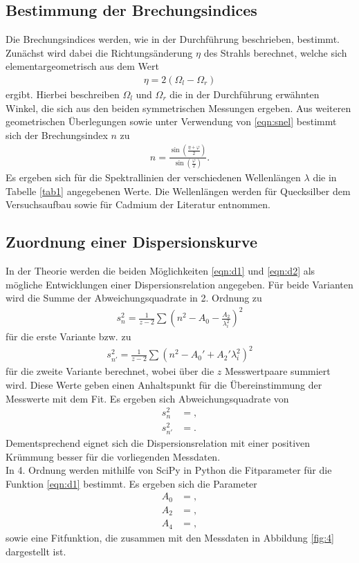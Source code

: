 \subsection{Bestimmung der Brechungsindices}
Die Brechungsindices werden, wie in der Durchführung beschrieben, bestimmt.
Zunächst wird dabei die Richtungsänderung $\eta$ des Strahls berechnet, welche sich elementargeometrisch aus dem Wert
\begin{align}
  \eta = 2 (\Omega_l - \Omega_r)
\end{align}
ergibt.
Hierbei beschreiben $\Omega_l$ und $\Omega_r$ die in der Durchführung erwähnten Winkel, die sich aus den beiden symmetrischen Messungen ergeben.
Aus weiteren geometrischen Überlegungen sowie unter Verwendung von \eqref{eqn:snel} bestimmt sich der Brechungsindex $n$ zu
\begin{align}
  n = \frac{\sin{(\frac{\eta + \varphi}{2})}}{\sin{(\frac{\varphi}{2})}}.
\end{align}
Es ergeben sich für die Spektrallinien der verschiedenen Wellenlängen $\lambda$ die in Tabelle \ref{tab1} angegebenen Werte.
Die Wellenlängen werden für Quecksilber dem Versuchsaufbau sowie für Cadmium der Literatur \cite{cd} entnommen.
    

\subsection{Zuordnung einer Dispersionskurve}
In der Theorie werden die beiden Möglichkeiten \eqref{eqn:d1} und \eqref{eqn:d2} als mögliche Entwicklungen einer Dispersionsrelation angegeben.
Für beide Varianten wird die Summe der Abweichungsquadrate in 2. Ordnung zu
\begin{align*}
  s_n^2 = \frac{1}{z-2} \sum ( n^2 - A_0 - \frac{A_2}{\lambda_i^2} )^2
\end{align*}
für die erste Variante bzw. zu
\begin{align*}
  s_{n'}^2 = \frac{1}{z-2} \sum ( n^2 - A_0' + A_2' \lambda_i^2 )^2
\end{align*}
für die zweite Variante berechnet, wobei über die $z$ Messwertpaare summiert wird.
Diese Werte geben einen Anhaltspunkt für die Übereinstimmung der Messwerte mit dem Fit.
Es ergeben sich Abweichungsquadrate von
\begin{align*}
  s_n^2 &= ,\\
  s_{n'}^2 &= .
\end{align*}
Dementsprechend eignet sich die Dispersionsrelation mit einer positiven Krümmung besser für die vorliegenden Messdaten.\\
In 4. Ordnung werden mithilfe von SciPy in Python die Fitparameter für die Funktion \eqref{eqn:d1} bestimmt.
Es ergeben sich die Parameter
\begin{align*}
A_0 &= ,\\
A_2 &= ,\\
A_4 &= ,
\end{align*}
sowie eine Fitfunktion, die zusammen mit den Messdaten in Abbildung \ref{fig:4} dargestellt ist.

